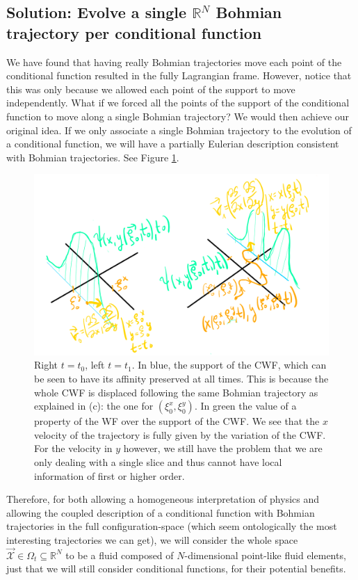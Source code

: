 \documentclass[11pt, a4paper]{article} %
\newcommand{\R}{\mathbb{R}} %
\newcommand{\x}{\mathcal{X}}
\DeclareRobustCommand{\mybox}[2][gray!10]{%
\begin{tcolorbox}[   %
        left=0.2cm,
        right=0.2cm,
        top=0.15cm,
        bottom=0.15cm,
        colback=#1,
        colframe=#1,
        width=\dimexpr\textwidth\relax, 
        enlarge left by=0mm,
        boxsep=5pt,
        arc=0pt,outer arc=0pt,
        ]
        #2
\end{tcolorbox}
}
\begin{document}
\mybox{
\subsection*{Solution: Evolve a single $\R^N$ Bohmian trajectory per conditional function}
We have found that having really Bohmian trajectories move each point of the conditional function resulted in the fully Lagrangian frame. However, notice that this was only because we allowed each point of the support to move independently. What if we forced all the points of the support of the conditional function to move along a single Bohmian trajectory? We would then achieve our original idea. If we only associate a single Bohmian trajectory to the evolution of a conditional function, we will have a partially Eulerian description consistent with Bohmian trajectories. See Figure \ref{fig:singleTraj}. 

}
\begin{figure}[h!]
  \centering
    \includegraphics[width=0.65\linewidth]{moving_bohmian.png}
  \caption{Right $t=t_0$, left $t=t_1$. In blue, the support of the CWF, which can be seen to have its affinity preserved at all times. This is because the whole CWF is displaced following the same Bohmian trajectory as explained in (c): the one for $(\xi^x_0, \xi^y_0)$. In green the value of a property of the WF over the support of the CWF. We see that the $x$ velocity of the trajectory is fully given by the variation of the CWF. For the velocity in $y$ however, we still have the problem that we are only dealing with a single slice and thus cannot have local information of first or higher order. }
  \label{fig:singleTraj}
\end{figure}

Therefore, for both allowing a homogeneous interpretation of physics and allowing the coupled description of a conditional function with Bohmian trajectories in the full configuration-space (which seem ontologically the most interesting trajectories we can get), we will consider the whole space $\vec{\x}\in\Omega_t\subseteq\R^N$ to be a fluid composed of $N$-dimensional point-like fluid elements, just that we will still consider conditional functions, for their potential benefits.
\end{document}
